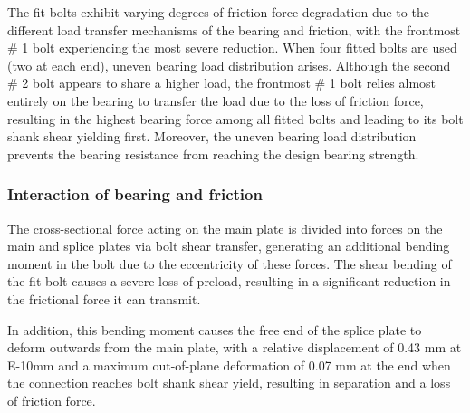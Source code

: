 The fit bolts exhibit varying degrees of friction force degradation due to the different load transfer mechanisms of the bearing and friction, with the frontmost \# 1 bolt experiencing the most severe reduction. When four fitted bolts are used (two at each end), uneven bearing load distribution arises. Although the second \# 2 bolt appears to share a higher load, the frontmost \# 1 bolt relies almost entirely on the bearing to transfer the load due to the loss of friction force, resulting in the highest bearing force among all fitted bolts and leading to its bolt shank shear yielding first. Moreover, the uneven bearing load distribution prevents the bearing resistance from reaching the design bearing strength.



\subsubsection*{Interaction of bearing and friction}

The cross-sectional force acting on the main plate is divided into forces on the main and splice plates via bolt shear transfer, generating an additional bending moment in the bolt due to the eccentricity of these forces. The shear bending of the fit bolt causes a severe loss of preload, resulting in a significant reduction in the frictional force it can transmit.

In addition, this bending moment causes the free end of the splice plate to deform outwards from the main plate, with a relative displacement of 0.43 mm at E-10mm and a maximum out-of-plane deformation of 0.07 mm at the end when the connection reaches bolt shank shear yield, resulting in separation and a loss of friction force. 

